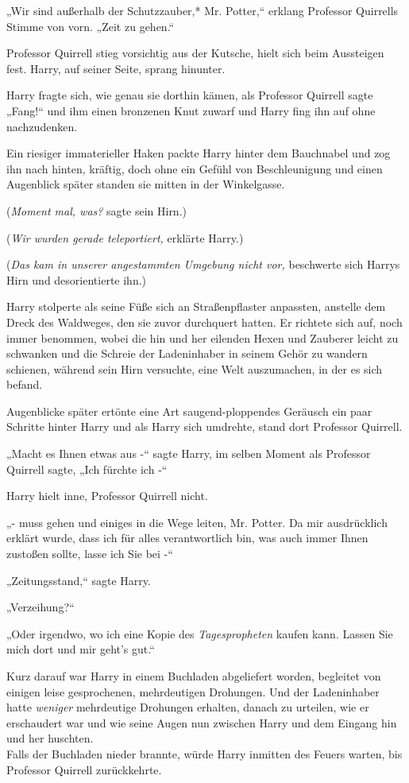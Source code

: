 {„Wir sind außerhalb der Schutzzauber,* Mr. Potter,“ erklang Professor Quirrells Stimme von vorn. „Zeit zu gehen.“

Professor Quirrell stieg vorsichtig aus der Kutsche, hielt sich beim Aussteigen fest. Harry, auf seiner Seite, sprang hinunter.

Harry fragte sich, wie genau sie dorthin kämen, als Professor Quirrell sagte „Fang!“ und ihm einen bronzenen Knut zuwarf und Harry fing ihn auf ohne nachzudenken.

Ein riesiger immaterieller Haken packte Harry hinter dem Bauchnabel und zog ihn nach hinten, kräftig, doch ohne ein Gefühl von Beschleunigung und einen Augenblick später standen sie mitten in der Winkelgasse.

(\emph{Moment mal, was?} sagte sein Hirn.)

(\emph{Wir wurden gerade teleportiert,} erklärte Harry.)

(\emph{Das kam in unserer angestammten Umgebung nicht vor,} beschwerte sich Harrys Hirn und desorientierte ihn.)

Harry stolperte als seine Füße sich an Straßenpflaster anpassten, anstelle dem Dreck des Waldweges, den sie zuvor durchquert hatten. Er richtete sich auf, noch immer benommen, wobei die hin und her eilenden Hexen und Zauberer leicht zu schwanken und die Schreie der Ladeninhaber in seinem Gehör zu wandern schienen, während sein Hirn versuchte, eine Welt auszumachen, in der es sich befand.

Augenblicke später ertönte eine Art saugend-ploppendes Geräusch ein paar Schritte hinter Harry und als Harry sich umdrehte, stand dort Professor Quirrell.

„Macht es Ihnen etwas aus -“ sagte Harry, im selben Moment als Professor Quirrell sagte, „Ich fürchte ich -“

Harry hielt inne, Professor Quirrell nicht.

„- muss gehen und einiges in die Wege leiten, Mr. Potter. Da mir ausdrücklich erklärt wurde, dass ich für alles verantwortlich bin, was auch immer Ihnen zustoßen sollte, lasse ich Sie bei -“

„Zeitungsstand,“ sagte Harry.

„Verzeihung?“

„Oder irgendwo, wo ich eine Kopie des \emph{Tagespropheten} kaufen kann. Lassen Sie mich dort und mir geht's gut.“

Kurz darauf war Harry in einem Buchladen abgeliefert worden, begleitet von einigen leise gesprochenen, mehrdeutigen Drohungen. Und der Ladeninhaber hatte \emph{weniger} mehrdeutige Drohungen erhalten, danach zu urteilen, wie er erschaudert war und wie seine Augen nun zwischen Harry und dem Eingang hin und her huschten.\\ Falls der Buchladen nieder brannte, würde Harry inmitten des Feuers warten, bis Professor Quirrell zurückkehrte.

}
